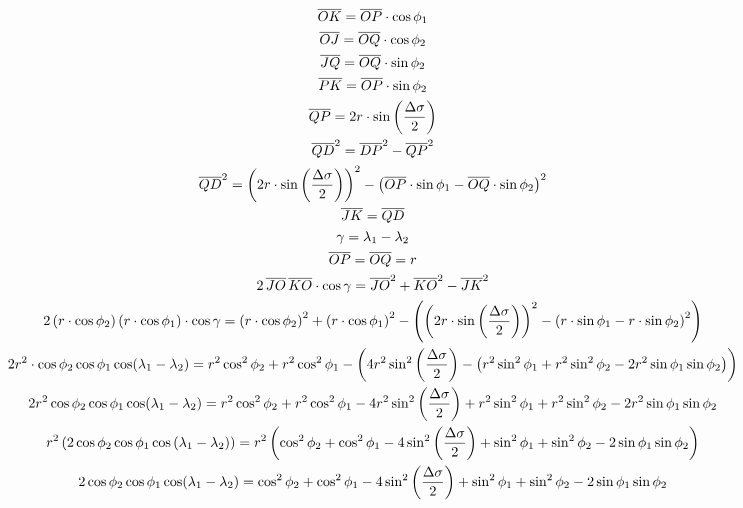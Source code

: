 \documentclass[10pt]{article}
\begin{document}
\begin{gather}
\allowdisplaybreaks
\overline{OK}=\overline{OP}\cdot\cos\phi_1\\
\allowdisplaybreaks
\overline{OJ}=\overline{OQ}\cdot\cos\phi_2\\
\allowdisplaybreaks
\overline{JQ}=\overline{OQ}\cdot\sin\phi_2\\
\allowdisplaybreaks
\overline{PK}=\overline{OP}\cdot\sin\phi_2\\
\allowdisplaybreaks
\overline{QP}=2r\cdot\sin\left(\frac{\Delta\sigma}{2}\right)\\
\allowdisplaybreaks
\overline{QD}^2=\overline{DP}^2-\overline{QP}^2\\
\allowdisplaybreaks
\overline{QD}^2=\left(2r\cdot\sin\left(\frac{\Delta\sigma}{2}\right)\right)^2-\left(\overline{OP}\cdot\sin\phi_1-\overline{OQ}\cdot\sin\phi_2\right)^2\\
\overline{JK}=\overline{QD}\\ %
\gamma=\lambda_1-\lambda_2\\
\overline{OP}=\overline{OQ}=r\\
2\,\overline{JO}\,\overline{KO}\cdot\cos\gamma=\overline{JO}^2+\overline{KO}^2-\overline{JK}^2\\
2\left(r\cdot\cos\phi_2\right)\left(r\cdot\cos\phi_1\right)\cdot\cos\gamma=\left(r\cdot\cos\phi_2\right)^2+\left(r\cdot\cos\phi_1\right)^2-\left(\left(2r\cdot\sin\left(\frac{\Delta\sigma}{2}\right)\right)^2-\left(r\cdot\sin\phi_1-r\cdot\sin\phi_2\right)^2\right)\\
2r^2\cdot\cos\phi_2\cos\phi_1\cos(\lambda_1-\lambda_2)=r^2\cos^2\phi_2+r^2\cos^2\phi_1-\left(4r^2\sin^2\left(\frac{\Delta\sigma}{2}\right)-\left(r^2\sin^2\phi_1+r^2\sin^2\phi_2-2r^2\sin\phi_1\sin\phi_2\right)\right)\\
\allowdisplaybreaks
2r^2\cos\phi_2\cos\phi_1\cos(\lambda_1-\lambda_2)=r^2\cos^2\phi_2+r^2\cos^2\phi_1-4r^2\sin^2\left(\frac{\Delta\sigma}{2}\right)+r^2\sin^2\phi_1+r^2\sin^2\phi_2-2r^2\sin\phi_1\sin\phi_2\\
\allowdisplaybreaks
r^2\left(2\cos\phi_2\cos\phi_1\cos\left(\lambda_1-\lambda_2\right)\right)=r^2\left(\cos^2\phi_2+\cos^2\phi_1-4\sin^2\left(\frac{\Delta\sigma}{2}\right)+\sin^2\phi_1+\sin^2\phi_2-2\sin\phi_1\sin\phi_2\right)\\
\allowdisplaybreaks
2\cos\phi_2\cos\phi_1\cos(\lambda_1-\lambda_2)=\cos^2\phi_2+\cos^2\phi_1-4\sin^2\left(\frac{\Delta\sigma}{2}\right)+\sin^2\phi_1+\sin^2\phi_2-2\sin\phi_1\sin\phi_2\\
\allowdisplaybreaks

\end{gather}
\end{document}
